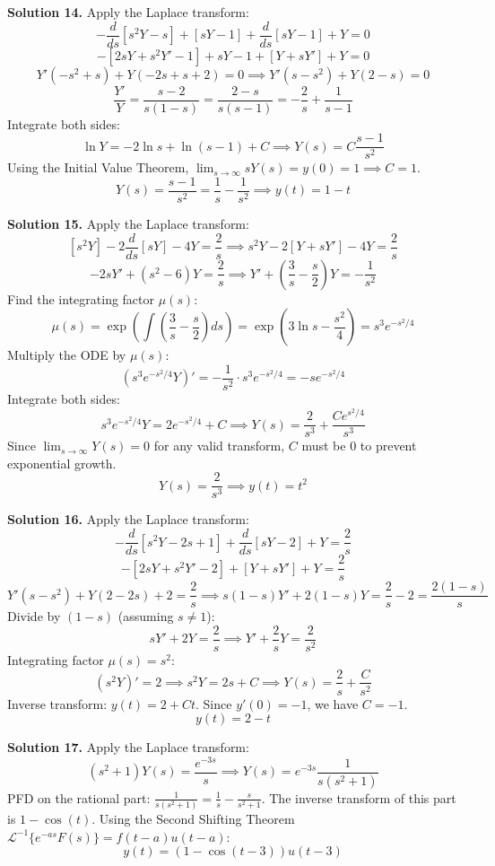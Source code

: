 \documentclass[11pt, letterpaper]{article}
\theoremstyle{definition}
\theoremstyle{remark}
\begin{document}
\vspace{1em}
\textbf{Solution 14.}
Apply the Laplace transform:
\[ -\frac{d}{ds}[s^2 Y - s] + [sY - 1] + \frac{d}{ds}[sY - 1] + Y = 0 \]
\[ -[2sY + s^2 Y' - 1] + sY - 1 + [Y + sY'] + Y = 0 \]
\[ Y'(-s^2 + s) + Y(-2s + s + 2) = 0 \implies Y'(s - s^2) + Y(2 - s) = 0 \]
\[ \frac{Y'}{Y} = \frac{s - 2}{s(1 - s)} = \frac{2 - s}{s(s - 1)} = -\frac{2}{s} + \frac{1}{s - 1} \]
Integrate both sides:
\[ \ln Y = -2\ln s + \ln(s - 1) + C \implies Y(s) = C\frac{s - 1}{s^2} \]
Using the Initial Value Theorem, $\lim_{s \to \infty} sY(s) = y(0) = 1 \implies C = 1$.
\[ Y(s) = \frac{s - 1}{s^2} = \frac{1}{s} - \frac{1}{s^2} \implies y(t) = 1 - t \]

\vspace{1em}
\textbf{Solution 15.}
Apply the Laplace transform:
\[ [s^2 Y] - 2\frac{d}{ds}[sY] - 4Y = \frac{2}{s} \implies s^2 Y - 2[Y + sY'] - 4Y = \frac{2}{s} \]
\[ -2sY' + (s^2 - 6)Y = \frac{2}{s} \implies Y' + \left(\frac{3}{s} - \frac{s}{2}\right)Y = -\frac{1}{s^2} \]
Find the integrating factor $\mu(s)$:
\[ \mu(s) = \exp\left(\int \left(\frac{3}{s} - \frac{s}{2}\right) ds\right) = \exp\left(3\ln s - \frac{s^2}{4}\right) = s^3 e^{-s^2/4} \]
Multiply the ODE by $\mu(s)$:
\[ (s^3 e^{-s^2/4} Y)' = -\frac{1}{s^2} \cdot s^3 e^{-s^2/4} = -s e^{-s^2/4} \]
Integrate both sides:
\[ s^3 e^{-s^2/4} Y = 2e^{-s^2/4} + C \implies Y(s) = \frac{2}{s^3} + \frac{C e^{s^2/4}}{s^3} \]
Since $\lim_{s \to \infty} Y(s) = 0$ for any valid transform, $C$ must be $0$ to prevent exponential growth.
\[ Y(s) = \frac{2}{s^3} \implies y(t) = t^2 \]

\vspace{1em}
\textbf{Solution 16.}
Apply the Laplace transform:
\[ -\frac{d}{ds}[s^2 Y - 2s + 1] + \frac{d}{ds}[sY - 2] + Y = \frac{2}{s} \]
\[ -[2sY + s^2 Y' - 2] + [Y + sY'] + Y = \frac{2}{s} \]
\[ Y'(s - s^2) + Y(2 - 2s) + 2 = \frac{2}{s} \implies s(1 - s)Y' + 2(1 - s)Y = \frac{2}{s} - 2 = \frac{2(1 - s)}{s} \]
Divide by $(1 - s)$ (assuming $s \neq 1$):
\[ sY' + 2Y = \frac{2}{s} \implies Y' + \frac{2}{s}Y = \frac{2}{s^2} \]
Integrating factor $\mu(s) = s^2$:
\[ (s^2 Y)' = 2 \implies s^2 Y = 2s + C \implies Y(s) = \frac{2}{s} + \frac{C}{s^2} \]
Inverse transform: $y(t) = 2 + Ct$. Since $y'(0) = -1$, we have $C = -1$.
\[ y(t) = 2 - t \]

\vspace{1em}
\textbf{Solution 17.}
Apply the Laplace transform:
\[ (s^2 + 1)Y(s) = \frac{e^{-3s}}{s} \implies Y(s) = e^{-3s}\frac{1}{s(s^2 + 1)} \]
PFD on the rational part: $\frac{1}{s(s^2 + 1)} = \frac{1}{s} - \frac{s}{s^2 + 1}$.
The inverse transform of this part is $1 - \cos(t)$.
Using the Second Shifting Theorem $\mathcal{L}^{-1}\{e^{-as}F(s)\} = f(t - a)u(t - a)$:
\[ y(t) = (1 - \cos(t - 3))u(t - 3) \]
\end{document}
